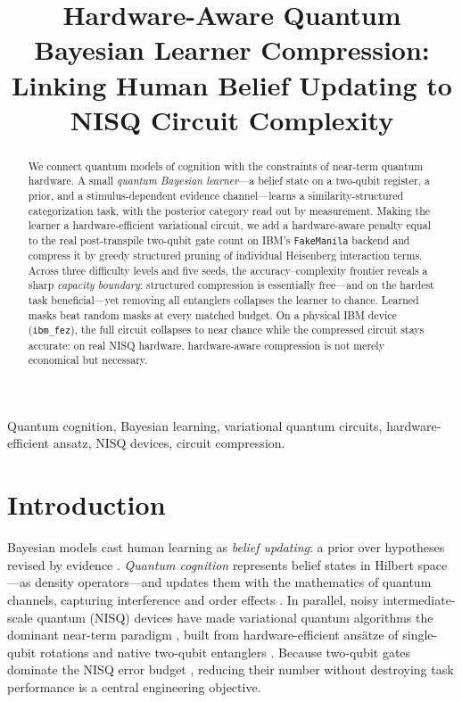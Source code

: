 \documentclass[10pt,conference]{IEEEtran}
\begin{document}
\title{Hardware-Aware Quantum Bayesian Learner Compression:\\ Linking Human Belief Updating to NISQ Circuit Complexity}

\author{
}

\maketitle

\begin{abstract}
We connect quantum models of cognition with the constraints of near-term quantum hardware. A
small \emph{quantum Bayesian learner}---a belief state on a two-qubit register, a prior, and a
stimulus-dependent evidence channel---learns a similarity-structured categorization task, with
the posterior category read out by measurement. Making the learner a hardware-efficient
variational circuit, we add a hardware-aware penalty equal to the real post-transpile two-qubit
gate count on IBM's \texttt{FakeManila} backend and compress it by greedy structured pruning of
individual Heisenberg interaction terms. Across three difficulty levels and five seeds, the
accuracy--complexity frontier reveals a sharp \emph{capacity boundary}: structured compression
is essentially free---and on the hardest task beneficial---yet removing all entanglers collapses
the learner to chance. Learned masks beat random masks at every matched budget. On a physical
IBM device (\texttt{ibm\_fez}), the full circuit collapses to near chance while the compressed
circuit stays accurate: on real NISQ hardware, hardware-aware compression is not merely
economical but necessary.
\end{abstract}

\begin{IEEEkeywords}
Quantum cognition, Bayesian learning, variational quantum circuits, hardware-efficient ansatz,
NISQ devices, circuit compression.
\end{IEEEkeywords}

\section{Introduction}
Bayesian models cast human learning as \emph{belief updating}: a prior over hypotheses revised
by evidence \cite{b1}. \emph{Quantum cognition} represents belief states in Hilbert space---as
density operators---and updates them with the mathematics of quantum channels, capturing
interference and order effects \cite{b3}. In parallel, noisy intermediate-scale quantum (NISQ)
devices \cite{b7} have made variational quantum algorithms the dominant near-term paradigm
\cite{b6}, built from hardware-efficient ans\"atze of single-qubit rotations and native
two-qubit entanglers \cite{b4,b5}. Because two-qubit gates dominate the NISQ error budget
\cite{b7,b10}, reducing their number without destroying task performance is a central
engineering objective.
\end{document}
